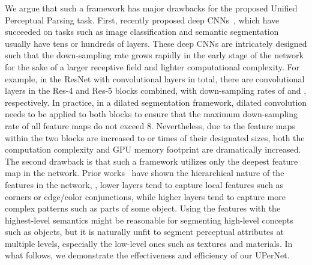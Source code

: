 \documentclass[runningheads]{llncs}
\begin{document}
We argue that such a framework has major drawbacks for the proposed Unified Perceptual Parsing task. First, recently proposed deep CNNs~\cite{he2016deep,xie2017aggregated}, which have succeeded on tasks such as image classification and semantic segmentation usually have tens or hundreds of layers. These deep CNNs are intricately designed such that the down-sampling rate grows rapidly in the early stage of the network for the sake of a larger receptive field and lighter computational complexity. For example, in the ResNet with  convolutional layers in total, there are  convolutional layers in the Res-4 and Res-5 blocks combined, with down-sampling rates of  and , respectively. In practice, in a dilated segmentation framework, dilated convolution needs to be applied to both blocks to ensure that the maximum down-sampling rate of all feature maps do not exceed 8. Nevertheless, due to the feature maps within the two blocks are increased to  or  times of their designated sizes, both the computation complexity and GPU memory footprint are dramatically increased. The second drawback is that such a framework utilizes only the deepest feature map in the network. Prior works~\cite{zeiler2014visualizing} have shown the hierarchical nature of the features in the network, \ie, lower layers tend to capture local features such as corners or edge/color conjunctions, while higher layers tend to capture more complex patterns such as parts of some object. Using the features with the highest-level semantics might be reasonable for segmenting high-level concepts such as objects, but it is naturally unfit to segment perceptual attributes at multiple levels, especially the low-level ones such as textures and materials. In what follows, we demonstrate the effectiveness and efficiency of our UPerNet.
\end{document}
